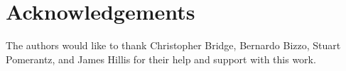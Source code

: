 \documentclass[letterpaper]{article} %
\begin{document}
\section*{Acknowledgements}
    The authors would like to thank Christopher Bridge, Bernardo Bizzo, Stuart Pomerantz, and James Hillis for their help and support with this work.



\appendix

    
\end{document}
